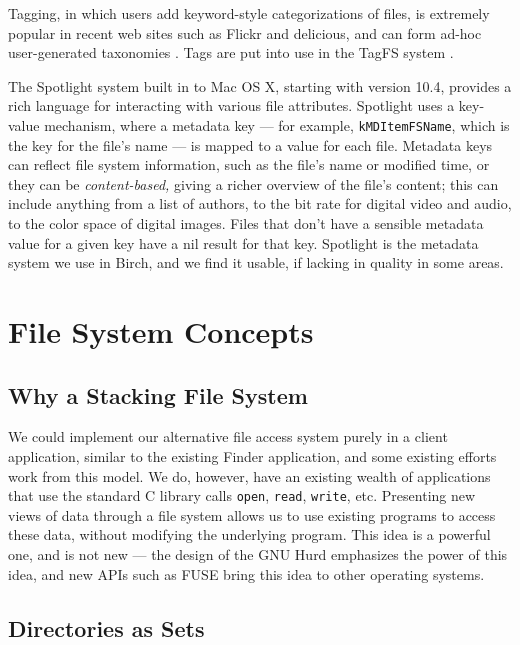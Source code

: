 \documentclass{article}
\begin{document}
Tagging, in which users add keyword-style categorizations of files, is
extremely popular in recent web sites such as Flickr and delicious,
and can form ad-hoc user-generated taxonomies \cite{Mathes:2004}. Tags
are put into use in the TagFS system \cite{Bloehdorn:2006}.

The Spotlight system built in to Mac OS X, starting with version 10.4,
provides a rich language for interacting with various file
attributes. Spotlight uses a key-value mechanism, where a metadata key
--- for example, \texttt{kMDItemFSName}, which is the key for the
file's name --- is mapped to a value for each file. Metadata keys can
reflect file system information, such as the file's name or modified
time, or they can be \textit{content-based,} giving a richer overview
of the file's content; this can include anything from a list of
authors, to the bit rate for digital video and audio, to the color
space of digital images. Files that don't have a sensible metadata
value for a given key have a nil result for that key. Spotlight is the
metadata system we use in Birch, and we find it usable, if lacking in
quality in some areas.

\section{File System Concepts}

\subsection{Why a Stacking File System}

We could implement our alternative file access system purely in a
client application, similar to the existing Finder application, and
some existing efforts \cite{Gorter:2004,Nickell:2006} work from this
model. We do, however, have an existing wealth of applications that
use the standard C library calls \texttt{open}, \texttt{read},
\texttt{write}, etc. Presenting new views of data through a file
system allows us to use existing programs to access these data,
without modifying the underlying program. This idea is a powerful one,
and is not new --- the design of the GNU Hurd \cite{Bushnell:1994}
emphasizes the power of this idea, and new APIs such as FUSE
\cite{Szeredi:2006} bring this idea to other operating systems.

\subsection{Directories as Sets}
\end{document}
